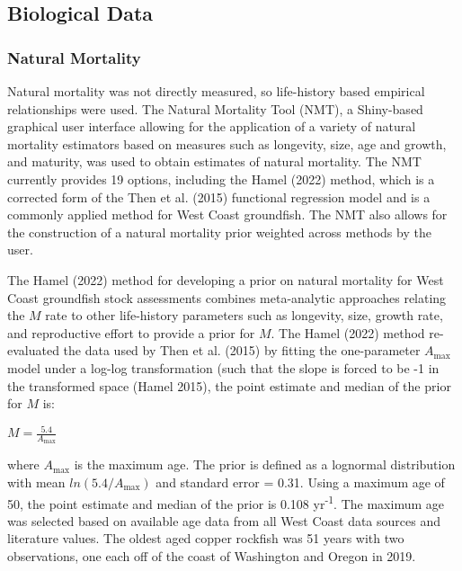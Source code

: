 \documentclass[11pt,
  english,
  letterpaper,
]{article}
\begin{document}
\hypertarget{biological-data}{%
\subsection{Biological Data}\label{biological-data}}

\hypertarget{natural-mortality}{%
\subsubsection{Natural Mortality}\label{natural-mortality}}

Natural mortality was not directly measured, so life-history based empirical relationships were used. The Natural Mortality Tool (NMT), a Shiny-based graphical user interface allowing for the application of a variety of natural mortality estimators based on measures such as longevity, size, age and growth, and maturity, was used to obtain estimates of natural mortality. The NMT currently provides 19 options, including the Hamel (2022) method, which is a corrected form of the Then et al. (2015) functional regression model and is a commonly applied method for West Coast groundfish. The NMT also allows for the construction of a natural mortality prior weighted across methods by the user.

The Hamel (2022) method for developing a prior on natural mortality for West Coast groundfish stock assessments combines meta-analytic approaches relating the \(M\) rate to other life-history parameters such as longevity, size, growth rate, and reproductive effort to provide a prior for \(M\). The Hamel (2022) method re-evaluated the data used by Then et al. (2015) by fitting the one-parameter \(A_{\text{max}}\) model under a log-log transformation (such that the slope is forced to be -1 in the transformed space (Hamel 2015), the point estimate and median of the prior for \(M\) is:

\begin{centering}

$M=\frac{5.4}{A_{\text{max}}}$

\end{centering}

\vspace{0.5cm}

where \(A_{\text{max}}\) is the maximum age. The prior is defined as a lognormal distribution with mean \(ln(5.4/A_{\text{max}})\) and standard error = 0.31. Using a maximum age of 50, the point estimate and median of the prior is 0.108 yr\textsuperscript{-1}. The maximum age was selected based on available age data from all West Coast data sources and literature values. The oldest aged copper rockfish was 51 years with two observations, one each off of the coast of Washington and Oregon in 2019.
\end{document}
